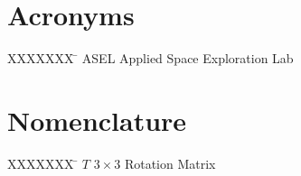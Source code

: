 \documentclass[12pt,letterpaper]{article}
\begin{document}
\pagebreak
{}

\pagebreak
\tableofcontents

\listoffigures

\listoftables


\pagebreak
\section*{Acronyms}
\begin{tabbing}
XXXXXXX \= \kill%
ASEL	\> \qquad Applied Space Exploration Lab \\

\end{tabbing}

\section*{Nomenclature}
\begin{tabbing}
 XXXXXXX \= \kill%
  $T$	\> \qquad $3 \times 3$ Rotation Matrix \\

\end{tabbing}

\pagebreak


\end{document}
